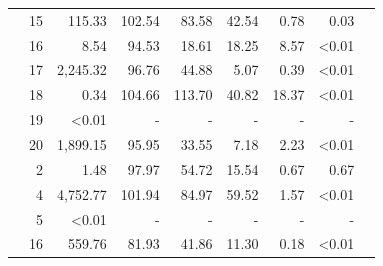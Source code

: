 \begin{table}
\begin{tabular}{crrrrrrrr}
& 15 & 115.33 & 102.54 & 83.58 & 42.54 & 0.78 & 0.03 \\ 
& 16 & 8.54 & 94.53 & 18.61 & 18.25 & 8.57 & <0.01 \\ 
& 17 & 2,245.32 & 96.76 & 44.88 & 5.07 & 0.39 & <0.01 \\ 
& 18 & 0.34 & 104.66 & 113.70 & 40.82 & 18.37 & <0.01 \\ 
& 19 & <0.01 & - & - & - & - & - \\ 
& 20 & 1,899.15 & 95.95 & 33.55 & 7.18 & 2.23 & <0.01 \\
\noalign{\medskip}
\parbox[t]{2mm}{} &
2 & 1.48 & 97.97 & 54.72 & 15.54 & 0.67 & 0.67 \\
& 4 & 4,752.77 & 101.94 & 84.97 & 59.52 & 1.57 & <0.01 \\
& 5 & <0.01 & - & - & - & - & - \\
& 16 & 559.76 & 81.93 & 41.86 & 11.30 & 0.18 & <0.01 \\
\hline
\end{tabular}
\end{table}

